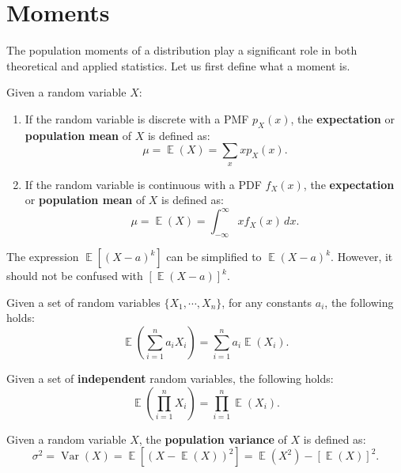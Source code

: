 \documentclass{huhtakm-template-book-v2}
\DeclareMathOperator{\E}{\mathbb{E}}
\DeclareMathOperator{\Var}{Var}
\begin{document}
\section{Moments}
    The population moments of a distribution play a significant role in both theoretical and applied statistics. Let us first define what a moment is.
    \begin{defn}
        Given a random variable $X$:
        \begin{enumerate}
            \item If the random variable is discrete with a PMF $p_{X}(x)$, the \textbf{expectation} or \textbf{population mean} of $X$ is defined as:
            \begin{equation*}
                \mu = \E(X) = \sum_{x} x p_{X}(x).
            \end{equation*}
            \item If the random variable is continuous with a PDF $f_{X}(x)$, the \textbf{expectation} or \textbf{population mean} of $X$ is defined as:
            \begin{equation*}
                \mu = \E(X) = \int_{-\infty}^{\infty} x f_{X}(x) \, dx.
            \end{equation*}
        \end{enumerate}
    \end{defn}
    \begin{rem}
        The expression $\E[(X - a)^{k}]$ can be simplified to $\E(X - a)^{k}$. However, it should not be confused with $[\E(X - a)]^{k}$.
    \end{rem}
    \begin{lem}
        Given a set of random variables $\{X_{1}, \cdots, X_{n}\}$, for any constants $a_{i}$, the following holds:
        \begin{equation*}
            \E\left(\sum_{i=1}^{n} a_{i} X_{i}\right) = \sum_{i=1}^{n} a_{i} \E(X_{i}).
        \end{equation*}
    \end{lem}
    \begin{lem}
        Given a set of \textbf{independent} random variables, the following holds:
        \begin{equation*}
            \E\left(\prod_{i=1}^{n} X_{i}\right) = \prod_{i=1}^{n} \E(X_{i}).
        \end{equation*}
    \end{lem}
    \begin{defn}
        Given a random variable $X$, the \textbf{population variance} of $X$ is defined as:
        \begin{equation*}
            \sigma^{2} = \Var(X) = \E[(X - \E(X))^{2}] = \E(X^{2}) - [\E(X)]^{2}.
        \end{equation*}
    \end{defn}
\end{document}
